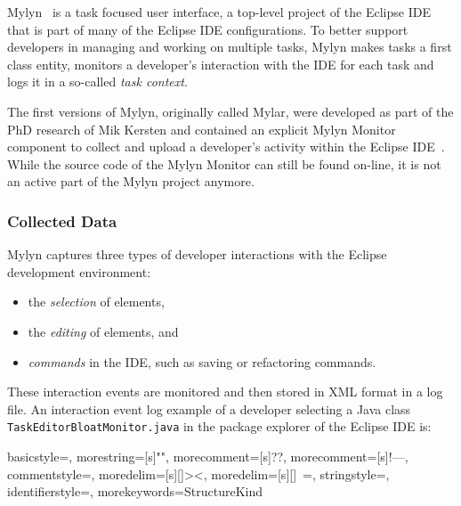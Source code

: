 

Mylyn~\cite{mylyn-web,Kersten-Mylar2005,Kersten-Mylin,kersten2007focusing} is a task focused user interface, a top-level project of the Eclipse IDE that is part of many of the Eclipse IDE configurations. To better support developers in managing and working on multiple tasks, Mylyn makes tasks a first class entity, monitors a developer's interaction with the IDE for each task and logs it in a so-called \textit{task context}.

The first versions of Mylyn, originally called Mylar, were developed as part of the PhD research of Mik Kersten and contained an explicit Mylyn Monitor component to collect and upload a developer's activity within the Eclipse IDE~\cite{mylyn-monitor}. While the source code of the Mylyn Monitor can still be found on-line, it is not an active part of the Mylyn project anymore.


\subsubsection{Collected Data}
Mylyn captures three types of developer interactions with the Eclipse development environment:
\begin{itemize}
    \item the \textit{selection} of elements,
    \item the \textit{editing} of elements, and
    \item \textit{commands} in the IDE, such as saving or refactoring commands.
\end{itemize}

These interaction events are monitored and then stored in XML format in a log file. An interaction event log example of a developer selecting a Java class \texttt{TaskEditorBloatMonitor.java} in the package explorer of the Eclipse IDE is:

{
  basicstyle=\ttfamily,
  morestring=[s]{"}{"},
  morecomment=[s]{?}{?},
  morecomment=[s]{!--}{--},
  commentstyle=\color{darkgreen},
  moredelim=[s][\color{darkblue}]{>}{<},
  moredelim=[s][\color{red}]{\ }{=},
  stringstyle=\color{blue},
  identifierstyle=\color{maroon},
  morekeywords={StructureKind}
}




